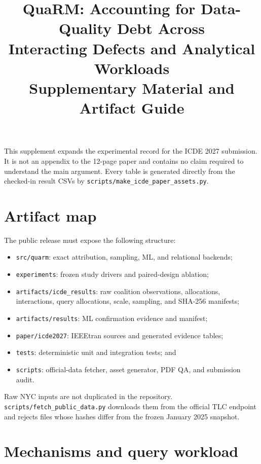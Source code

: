\documentclass[conference]{IEEEtran}
\title{QuaRM: Accounting for Data-Quality Debt Across\\
Interacting Defects and Analytical Workloads\\
{\large Supplementary Material and Artifact Guide}}
\author{\IEEEauthorblockN{\TODO{AUTHOR NAMES REQUIRED---SINGLE-BLIND SUBMISSION}}
\IEEEauthorblockA{\TODO{Affiliations, emails, and ORCIDs required before submission}}}
\begin{document}
\maketitle

This supplement expands the experimental record for the ICDE 2027 submission. It is not an appendix to the 12-page paper and contains no claim required to understand the main argument. Every table is generated directly from the checked-in result CSVs by \texttt{scripts/make\_icde\_paper\_assets.py}.

\section{Artifact map}

The public release must expose the following structure:

\begin{itemize}
  \item \texttt{src/quarm}: exact attribution, sampling, ML, and relational backends;
  \item \texttt{experiments}: frozen study drivers and paired-design ablation;
  \item \texttt{artifacts/icde\_results}: raw coalition observations, allocations, interactions, query allocations, scale, sampling, and SHA-256 manifests;
  \item \texttt{artifacts/results}: ML confirmation evidence and manifest;
  \item \texttt{paper/icde2027}: IEEEtran sources and generated evidence tables;
  \item \texttt{tests}: deterministic unit and integration tests; and
  \item \texttt{scripts}: official-data fetcher, asset generator, PDF QA, and submission audit.
\end{itemize}

Raw NYC inputs are not duplicated in the repository. \texttt{scripts/fetch\_public\_data.py} downloads them from the official TLC endpoint and rejects files whose hashes differ from the frozen January 2025 snapshot.

\section{Mechanisms and query workload}
\end{document}
